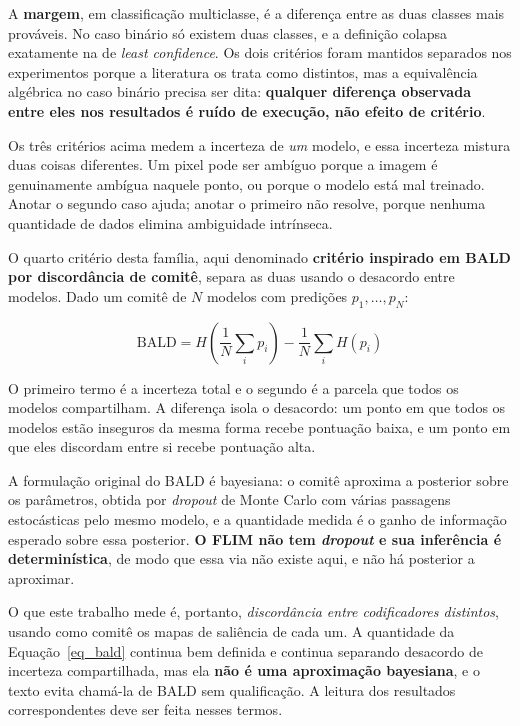A \textbf{margem}, em classificação multiclasse, é a diferença entre as duas classes mais prováveis. No caso binário só existem duas classes, e a definição colapsa exatamente na de \emph{least confidence}. Os dois critérios foram mantidos separados nos experimentos porque a literatura os trata como distintos, mas a equivalência algébrica no caso binário precisa ser dita: \textbf{qualquer diferença observada entre eles nos resultados é ruído de execução, não efeito de critério}.

Os três critérios acima medem a incerteza de \emph{um} modelo, e essa incerteza mistura duas coisas diferentes. Um pixel pode ser ambíguo porque a imagem é genuinamente ambígua naquele ponto, ou porque o modelo está mal treinado. Anotar o segundo caso ajuda; anotar o primeiro não resolve, porque nenhuma quantidade de dados elimina ambiguidade intrínseca.

O quarto critério desta família, aqui denominado \textbf{critério inspirado em \ac{BALD} por discordância de comitê}, separa as duas usando o desacordo entre modelos. Dado um comitê de $N$ modelos com predições $p_1, \dots, p_N$:

\begin{equation}
\text{BALD} = H\!\left(\frac{1}{N}\sum_i p_i\right) - \frac{1}{N}\sum_i H(p_i)
\label{eq_bald}
\end{equation}

O primeiro termo é a incerteza total e o segundo é a parcela que todos os modelos compartilham. A diferença isola o desacordo: um ponto em que todos os modelos estão inseguros da mesma forma recebe pontuação baixa, e um ponto em que eles discordam entre si recebe pontuação alta.

A formulação original do \ac{BALD} é bayesiana: o comitê aproxima a posterior sobre os parâmetros, obtida por \emph{dropout} de Monte Carlo com várias passagens estocásticas pelo mesmo modelo, e a quantidade medida é o ganho de informação esperado sobre essa posterior. \textbf{O \ac{FLIM} não tem \emph{dropout} e sua inferência é determinística}, de modo que essa via não existe aqui, e não há posterior a aproximar.

O que este trabalho mede é, portanto, \emph{discordância entre codificadores distintos}, usando como comitê os mapas de saliência de cada um. A quantidade da Equação~\ref{eq_bald} continua bem definida e continua separando desacordo de incerteza compartilhada, mas ela \textbf{não é uma aproximação bayesiana}, e o texto evita chamá-la de \ac{BALD} sem qualificação. A leitura dos resultados correspondentes deve ser feita nesses termos.

